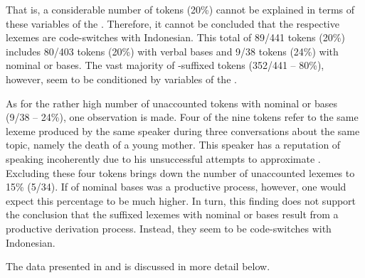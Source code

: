 That is, a considerable number of tokens (20\%) cannot be explained in terms of these variables of the . Therefore, it cannot be concluded that the respective lexemes are code-switches with Indonesian. This total of 89/441 tokens (20\%) includes 80/403 tokens (20\%) with verbal bases and 9/38 tokens (24\%) with nominal or  bases. The vast majority of -suffixed tokens (352/441 – 80\%), however, seem to be conditioned by variables of the .



As for the rather high number of unaccounted tokens with nominal or  bases (9/38 – 24\%), one observation is made. Four of the nine tokens refer to the same lexeme produced by the same speaker during three conversations about the same topic, namely the death of a young mother. This speaker has a reputation of speaking incoherently due to his unsuccessful attempts to approximate . Excluding these four tokens brings down the number of unaccounted lexemes to 15\% (5/34). If  of nominal bases was a productive process, however, one would expect this percentage to be much higher. In turn, this finding does not support the conclusion that the suffixed lexemes with nominal or  bases result from a productive derivation process. Instead, they seem to be code-switches with Indonesian.



The data presented in  and  is discussed in more detail below.

